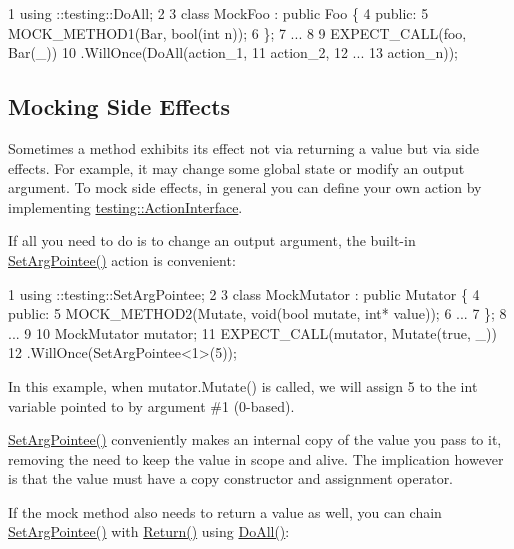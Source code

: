 \begin{DoxyCode}
1 using ::testing::DoAll;
2 
3 class MockFoo : public Foo \{
4  public:
5   MOCK\_METHOD1(Bar, bool(int n));
6 \};
7 ...
8 
9   EXPECT\_CALL(foo, Bar(\_))
10       .WillOnce(DoAll(action\_1,
11                       action\_2,
12                       ...
13                       action\_n));
\end{DoxyCode}


\subsection*{Mocking Side Effects}

Sometimes a method exhibits its effect not via returning a value but via side effects. For example, it may change some global state or modify an output argument. To mock side effects, in general you can define your own action by implementing {\ttfamily \hyperlink{classtesting_1_1_action_interface}{testing\+::\+Action\+Interface}}.

If all you need to do is to change an output argument, the built-\/in {\ttfamily \hyperlink{namespacetesting_a5740a5033b88c37666fcd09a269d123f}{Set\+Arg\+Pointee()}} action is convenient\+:


\begin{DoxyCode}
1 using ::testing::SetArgPointee;
2 
3 class MockMutator : public Mutator \{
4  public:
5   MOCK\_METHOD2(Mutate, void(bool mutate, int* value));
6   ...
7 \};
8 ...
9 
10   MockMutator mutator;
11   EXPECT\_CALL(mutator, Mutate(true, \_))
12       .WillOnce(SetArgPointee<1>(5));
\end{DoxyCode}


In this example, when {\ttfamily mutator.\+Mutate()} is called, we will assign 5 to the {\ttfamily int} variable pointed to by argument \#1 (0-\/based).

{\ttfamily \hyperlink{namespacetesting_a5740a5033b88c37666fcd09a269d123f}{Set\+Arg\+Pointee()}} conveniently makes an internal copy of the value you pass to it, removing the need to keep the value in scope and alive. The implication however is that the value must have a copy constructor and assignment operator.

If the mock method also needs to return a value as well, you can chain {\ttfamily \hyperlink{namespacetesting_a5740a5033b88c37666fcd09a269d123f}{Set\+Arg\+Pointee()}} with {\ttfamily \hyperlink{namespacetesting_af6d1c13e9376c77671e37545cd84359c}{Return()}} using {\ttfamily \hyperlink{namespacetesting_a5f533932753d2af95000e96c4a3042e3}{Do\+All()}}\+:


